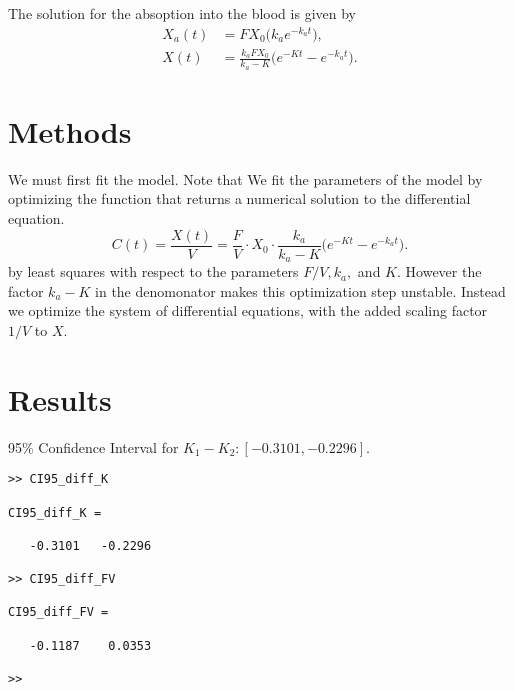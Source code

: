 \documentclass{homework}
\begin{document}
The solution for the absoption into the blood is given by 
\begin{align*}
X_a(t) &= FX_0 \big( k_ae^{-k_at} \big),\\ 
X(t) &= \frac{k_a F X_0}{k_a - K}\big( e^{-Kt} - e^{-k_a t}\big).
\end{align*}

\section{Methods}

We must first fit the model.  Note that We fit the parameters of the model by optimizing the function that returns a numerical solution to the differential equation.
$$C(t) = \frac{X(t)}{V} = \frac{F}{V} \cdot X_0 \cdot \frac{k_a}{k_a -K}\big( e^{-Kt} - e^{-k_a t}\big).$$
by least squares with respect to the parameters $F/V,k_a,$ and $K$.  However the factor $k_a - K$ in the denomonator makes this optimization step unstable.  Instead we optimize the system of differential equations, with the added scaling factor $1 / V$ to $X$.

\section{Results} 
95\% Confidence Interval for $K_1 - K_2: [-0.3101, -0.2296]$.
\begin{verbatim}
>> CI95_diff_K 

CI95_diff_K =

   -0.3101   -0.2296

>> CI95_diff_FV 

CI95_diff_FV =

   -0.1187    0.0353

>>      

\end{verbatim}
\end{document}
